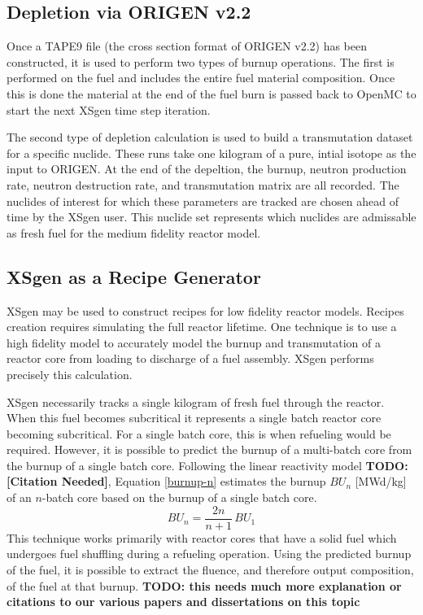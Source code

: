 \documentclass{article}
\newcommand{\TODO}[1] {{\color{red}\textbf{TODO: #1}}}
\newcommand{\citeme}{\TODO{[Citation Needed]}}
\begin{document}
\subsection{Depletion via ORIGEN v2.2}
\label{sec:origen}
Once a TAPE9 file (the cross section format of ORIGEN v2.2) has been constructed, it is
used to perform two types of burnup operations. The first is performed on the fuel and
includes the entire fuel material composition. Once this is done the material at the
end of the fuel burn is passed back to OpenMC to start the next XSgen time step iteration.

The second type of depletion calculation is used to build a transmutation dataset for a
specific nuclide. These runs take one kilogram of a pure, intial isotope as the input to
ORIGEN. At the end of the depeltion, the burnup, neutron production rate, neutron
destruction rate, and transmutation matrix are all recorded. The nuclides of interest
for which these parameters are tracked are chosen ahead of time by the XSgen user.
This nuclide set represents which nuclides are admissable as fresh fuel for the medium
fidelity reactor model.

\subsection{XSgen as a Recipe Generator}
XSgen may be used to construct recipes for low fidelity reactor models. Recipes creation
requires simulating the full reactor lifetime. One technique is to use a high fidelity
model to accurately model the burnup and transmutation of a reactor core from loading to
discharge of a fuel assembly. XSgen performs precisely this calculation.

XSgen necessarily tracks a single kilogram of fresh fuel through the reactor. When this
fuel becomes subcritical it represents a single batch reactor core becoming subcritical.
For a single batch core, this is when refueling would be required. However, it is possible
to predict the burnup of a multi-batch core from the burnup of a single batch core.
Following the linear reactivity model \citeme, Equation \ref{burnup-n} estimates the burnup
$BU_n$ [MWd/kg] of an $n$-batch core based on the burnup of a single batch core.
\begin{equation}
\label{burnup-n}
BU_n = \frac{2n}{n+1} \, BU_1
\end{equation}
This technique works primarily with reactor cores that have a solid fuel which undergoes
fuel shuffling during a refueling operation. Using the predicted burnup of the fuel,
it is possible to extract the fluence, and therefore output composition,
of the fuel at that burnup. \TODO{this needs much more explanation or citations to our various
papers and dissertations on this topic}
\end{document}
